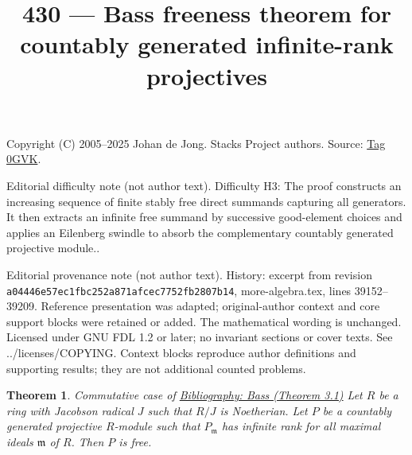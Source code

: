 \documentclass{amsart}
\newenvironment{reference}{\comment}{\endcomment}
\theoremstyle{plain}
\newtheorem{theorem}[subsection]{Theorem}
\theoremstyle{definition}
\theoremstyle{remark}
\numberwithin{equation}{subsection}
\begin{document}
\title[Stacks Project, Tag 0GVK]{430 --- Bass freeness theorem for countably generated infinite-rank projectives}
\maketitle
\noindent Copyright (C) 2005--2025 Johan de Jong. Stacks Project authors. Source: \href{https://stacks.math.columbia.edu/tag/0GVK}{Tag 0GVK}.

\noindent Editorial difficulty note (not author text). Difficulty H3: The proof constructs an increasing sequence of finite stably free direct summands capturing all generators. It then extracts an infinite free summand by successive good-element choices and applies an Eilenberg swindle to absorb the complementary countably generated projective module..

\noindent Editorial provenance note (not author text). History: excerpt from revision \texttt{a0444\allowbreak 6e57e\allowbreak c1fbc\allowbreak 252a8\allowbreak 71afc\allowbreak ec775\allowbreak 2fb28\allowbreak 07b14}, more-algebra.tex, lines 39152--39209. Reference presentation was adapted; original-author context and core support blocks were retained or added. The mathematical wording is unchanged. Licensed under GNU FDL 1.2 or later; no invariant sections or cover texts. See ../licenses/COPYING. Context blocks reproduce author definitions and supporting results; they are not additional counted problems.

\begin{theorem}
\label{theorem-countable-free}
\begin{reference}
Commutative case of \href{https://stacks.math.columbia.edu/bibliography}{Bibliography: Bass (Theorem 3.1)}
\end{reference}
Let $R$ be a ring with Jacobson radical $J$ such that $R/J$ is Noetherian.
Let $P$ be a countably generated projective $R$-module such that
$P_\mathfrak m$ has infinite rank for all maximal ideals
$\mathfrak m$ of $R$. Then $P$ is free.
\end{theorem}
\end{document}
